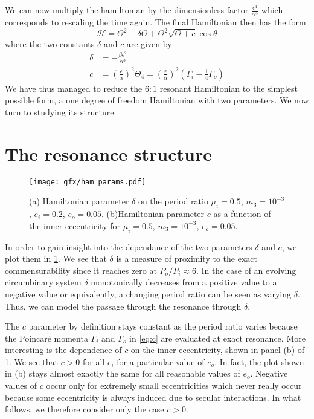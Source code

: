 \documentclass[ twoside,openright,titlepage,numbers=noenddot,headinclude,%
                footinclude=true,cleardoublepage=empty,abstractoff, %
                BCOR=5mm,paper=a4,fontsize=11pt,%
                american,%
                ]{scrreprt}
\begin{document}
We can now multiply the hamiltonian by the dimensionless factor 
$\frac{\epsilon^4}{\alpha^5}$ which corresponds to rescaling the time
again. The final Hamiltonian then has the form
\begin{equation}
    \mathcal{H}= \Theta^2-\delta\Theta +
     \Theta^2\sqrt{\Theta+ c}
    \cos\theta
    \label{eq:hamiltonian_final}
\end{equation}
where the two constants $\delta$ and $c$ are given by
\begin{align}
    \delta&= -\frac{\beta\epsilon^2}{\alpha^3}\label{eq:delta}\\
    c&= \left( \frac{\epsilon}{\alpha} \right)^2 \Theta_4
    =\left( \frac{\epsilon}{\alpha} \right)^2\left(\Gamma_i- \frac{1}{4}
    \Gamma_o\right)\label{eq:c}
\end{align}
We have thus managed to reduce the $6:1$ resonant Hamiltonian to the
simplest possible form, a one degree of freedom Hamiltonian with two
parameters. We now turn to studying its structure.
\section{The resonance structure}
\label{sec:The resonance structure}
\begin{figure}[htb]
\centering
    \texttt{[image: gfx/ham\_params.pdf]}
    \caption{(a) Hamiltonian parameter $\delta$
     on the period ratio $\mu_i=0.5$, $m_3=10^{-3}$, $e_i=0.2$, $e_o=0.05$.
     (b)Hamiltonian parameter $c$ as a function of the inner
     eccentricity for $\mu_i=0.5$, $m_3=10^{-3}$, $e_o=0.05$.}
\label{fig:ham_params}
\end{figure}
In order to gain insight into the dependance of the two parameters $\delta$
and $c$, we plot them in \cref{fig:ham_params}. We see that $\delta$ is a 
measure of proximity to the exact commensurability since it reaches 
zero at $P_o/P_i\approx 6$. In the case of an evolving circumbinary 
system $\delta$ monotonically decreases from a positive value to a negative
value or equivalently, a changing period ratio can be seen as varying
$\delta$. Thus, we can model the passage through the resonance through 
$\delta$.  

The $c$ parameter by definition stays constant as the period ratio varies
because the Poincaré momenta $\Gamma_i$ and $\Gamma_o$ in \cref{eq:c}
are evaluated at exact resonance. More interesting is the dependence
of $c$ on the inner eccentricity, shown in panel (b) of \cref{fig:ham_params}.
We see that $c>0$ for all $e_i$ for a particular value of $e_o$. In fact, the
plot shown in (b) stays almost exactly the same for all reasonable values
of $e_o$. Negative values of $c$ occur only for extremely small eccentricities
which never really occur because some eccentricity is always induced due to 
secular interactions. In what follows, we therefore consider only the case
$c>0$.
\end{document}
